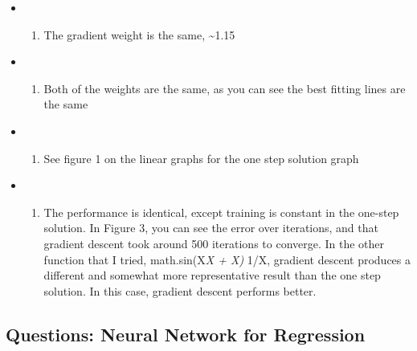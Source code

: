 \documentclass[11pt]{article}
\providecommand{\tightlist}{%
      \setlength{\itemsep}{0pt}\setlength{\parskip}{0pt}}
\begin{document}
\begin{itemize}
\item
  \begin{enumerate}
  \def\labelenumi{\alph{enumi})}
  \tightlist
  \item
    The gradient weight is the same, \textasciitilde{}1.15
  \end{enumerate}
\item
  \begin{enumerate}
  \def\labelenumi{\alph{enumi})}
  \setcounter{enumi}{1}
  \tightlist
  \item
    Both of the weights are the same, as you can see the best fitting
    lines are the same
  \end{enumerate}
\item
  \begin{enumerate}
  \def\labelenumi{\alph{enumi})}
  \setcounter{enumi}{2}
  \tightlist
  \item
    See figure 1 on the linear graphs for the one step solution graph
  \end{enumerate}
\item
  \begin{enumerate}
  \def\labelenumi{\alph{enumi})}
  \setcounter{enumi}{3}
  \tightlist
  \item
    The performance is identical, except training is constant in the
    one-step solution. In Figure 3, you can see the error over
    iterations, and that gradient descent took around 500 iterations to
    converge. In the other function that I tried, math.sin(X\emph{X + X)
    } 1/X, gradient descent produces a different and somewhat more
    representative result than the one step solution. In this case,
    gradient descent performs better.
  \end{enumerate}
\end{itemize}

    \subsection{Questions: Neural Network for
Regression}\label{questions-neural-network-for-regression}
\end{document}
